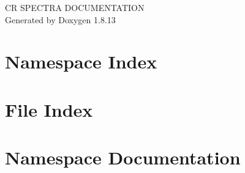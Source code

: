 \documentclass[twoside]{book}
\newcommand{\+}{\discretionary{\mbox{\scriptsize$\hookleftarrow$}}{}{}}
\newcommand{\clearemptydoublepage}{%
  \newpage{\pagestyle{empty}\cleardoublepage}%
}
\begin{document}
\hypersetup{pageanchor=false,
             bookmarksnumbered=true,
             pdfencoding=unicode
            }
\begin{titlepage}
\vspace*{7cm}
\begin{center}%
{\Large CR S\+P\+E\+C\+T\+RA D\+O\+C\+U\+M\+E\+N\+T\+A\+T\+I\+ON }\\
\vspace*{1cm}
{\large Generated by Doxygen 1.8.13}\\
\end{center}
\end{titlepage}
\clearemptydoublepage
{}
\tableofcontents
\clearemptydoublepage
{}
\hypersetup{pageanchor=true}

\chapter{Namespace Index}

\chapter{File Index}

\chapter{Namespace Documentation}







































\end{document}
